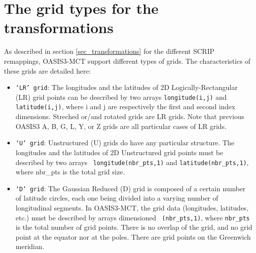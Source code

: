\newpage
\appendix
\chapter{The grid types for the transformations}
\label{subsec_gridtypes}

As described in section \ref{sec_transformations} for the different
SCRIP remappings, OASIS3-MCT support different types of grids. The
characteristics of these grids are detailed here:

\begin{itemize}

\item {\tt `LR' grid}: The longitudes and the latitudes of
  2D Logically-Rectangular (LR) grid points can be described by two arrays
  {\tt longitude(i,j)} and {\tt latitude(i,j)}, where i and j
  are respectively the first and second index dimensions. Streched
  or/and rotated grids are LR grids. Note that previous OASIS3 A, B, G, L, Y, or Z
  grids are all particular cases of LR grids.

\item {\tt `U' grid}: Unstructured (U) grids do have any particular
      structure. The longitudes and the latitudes of 2D Unstructured
      grid points must be described by two arrays {\tt
      longitude(nbr\_pts,1)} and {\tt latitude(nbr\_pts,1)}, where nbr\_pts
      is the total grid size.

\item {\tt `D' grid}: The Gaussian Reduced (D) grid is composed of a certain
number of latitude circles, each one being divided into a varying
number of longitudinal segments. In OASIS3-MCT, the grid data (longitudes,
latitudes, etc.) must be described by arrays dimensioned {\tt
(nbr\_pts,1)}, where {\tt nbr\_pts} is the total number of grid
points. There is no overlap of the grid, and no grid point at the
equator nor at the poles. There are grid points on the Greenwich
meridian.
 
\end{itemize}




